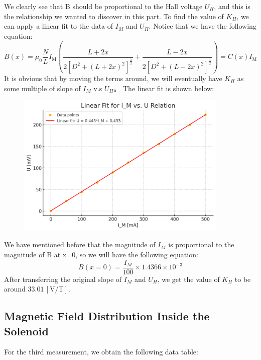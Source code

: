 \documentclass[12pt, a4paper, oneside]{article}
\begin{document}
We clearly see that B should be proportional to the Hall voltage $U_H$, and this is the relationship we wanted to discover in this part. 
To find the value of $K_H$, we can apply a linear fit to the data of $I_M$ and $U_H$. Notice that we have the following equation:
\begin{equation*}
	B(x) = \mu_0\frac{N}{L}I_\text{M}\left(\frac{L+2x}{2[D^2+(L+2x)^2]^{\frac{1}{2}}}+\frac{L-2x}{2[D^2+(L-2x)^2]^{\frac{1}{2}}}\right) = C(x)I_\text{M}
\end{equation*}
It is obvious that by moving the terms around, we will eventually have $K_H$ as some multiple of slope of $I_M$ v.s $U_H$。 The linear fit is shown below:
\begin{figure}[htbp]
	\centering
	\includegraphics[width=0.9\textwidth]{F4.png}
	\label{fig2}
\end{figure}
We have mentioned before that the magnitude of $I_M$ is proportional to the magnitude of B at x=0, so we will have the following equation:
\begin{equation*}
	B(x=0)=\frac{I_M}{100}\times1.4366\times10^{-3}
\end{equation*}
After transferring the original slope of $I_M$ and $U_H$, we get the value of $K_H$ to be around $33.01 \,[\text{V}/\text{T}].$

\subsection{Magnetic Field Distribution Inside the Solenoid}
\indent

For the third measurement, we obtain the following data table: 
\end{document}

